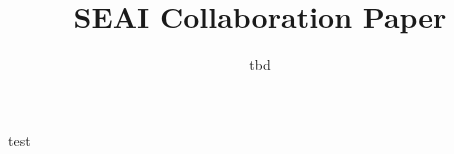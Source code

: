 \documentclass[sigconf,review,anonymous]{acmart}
\begin{document}
\title{SEAI Collaboration Paper}
	
	\author{tbd}

		\maketitle

	
test
\end{document}
